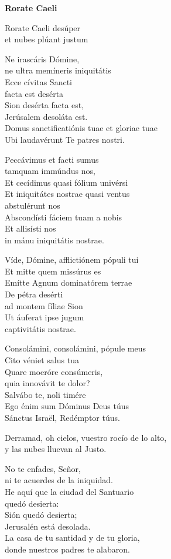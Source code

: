\begin{patercite}
	\textbf{Rorate Caeli}
	
	Rorate Caeli desúper \\et nubes plúant justum
	
	Ne irascáris Dómine, \\ne ultra memíneris iniquitátis \\Ecce cívitas Sancti \\facta est desérta \\Sion desérta facta est, \\Jerúsalem desoláta est. \\Domus sanctificatiónis tuae et gloriae tuae \\Ubi laudavérunt Te patres nostri.
	
	Peccávimus et facti sumus \\tamquam immúndus nos, \\Et cecídimus quasi fólium univérsi \\Et iniquitátes nostrae quasi ventus \\abstulérunt nos \\Abscondísti fáciem tuam a nobis \\Et allisísti nos \\in mánu iniquitátis nostrae.
	
	Víde, Dómine, afflictiónem pópuli tui \\Et mitte quem missúrus es \\Emítte Agnum dominatórem terrae \\De pétra desérti \\ad montem fíliae Sion \\Ut áuferat ipse jugum \\captivitátis nostrae.
	
	Consolámini, consolámini, pópule meus \\Cito véniet salus tua \\Quare moeróre consúmeris, \\quia innovávit te dolor? \\Salvábo te, noli timére \\Ego énim sum Dóminus Deus túus \\Sánctus Israël, Redémptor túus.\strut %
	
	
	Derramad, oh cielos, vuestro rocío de lo alto, \\y las nubes lluevan al Justo.
	
	No te enfades, Señor, \\ni te acuerdes de la iniquidad. \\He aquí que la ciudad del Santuario \\quedó desierta: \\Sión quedó desierta; \\Jerusalén está desolada. \\La casa de tu santidad y de tu gloria, \\donde nuestros padres te alabaron.
	

\end{patercite}
